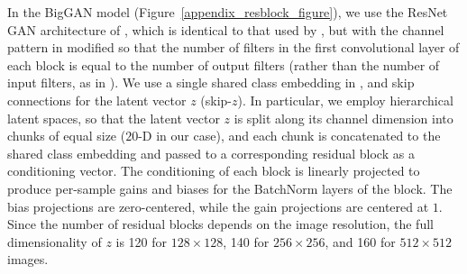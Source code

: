 In the BigGAN model (Figure~\ref{appendix_resblock_figure}), we use the ResNet \citep{he2016resnets} GAN architecture of \citep{zhang2018sagan}, which is identical to that used by \citep{miyato2018spectral}, but with the channel pattern in \discr{} modified so that the number of filters in the first convolutional layer of each block is equal to the number of output filters (rather than the number of input filters, as in \citet{miyato2018spectral, gulrajani2017improved}). 
We use a single shared class embedding in \gen{}, and skip connections for the latent vector $z$ (skip-$z$). In particular, we employ hierarchical latent spaces, so that the latent vector $z$ is split along its channel dimension into chunks of equal size ($20$-D in our case), and each chunk is concatenated to the shared class embedding and passed to a corresponding residual block as a conditioning vector.
The conditioning of each block is linearly projected to produce per-sample gains and biases for the BatchNorm layers of the block. The bias projections are zero-centered, while the gain projections are centered at $1$. Since the number of residual blocks depends on the image resolution, the full dimensionality of $z$ is 120 for $128\times 128$, 140 for $256\times 256$, and 160 for $512\times 512$ images.

